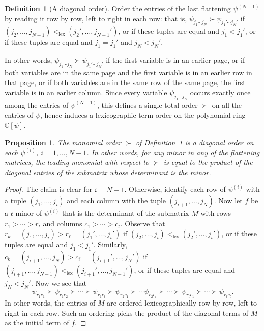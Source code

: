 \documentclass[12pt]{article}
\newtheorem{proposition}[theorem]{Proposition}
\theoremstyle{definition}
\newtheorem{definition}[theorem]{Definition}
\numberwithin{theorem}{section}
\newcommand{\CC}{\mathbb{C}}
\begin{document}
\begin{definition}[A diagonal order]\label{defn: diagonal order}
Order the entries of the last flattening $\psi^{(N-1)}$ by reading it row by row, left to right in each row: that is, $\psi_{j_1\cdots j_N} \succ \psi_{j_1'\cdots j_N'}$ if $(j_2,\ldots,j_{N-1}) <_{\mathrm{lex}} (j_2',\ldots,j_{N-1}')$, or if these tuples are equal and $j_1<j_1'$, or if these tuples are equal and $j_1=j_1'$ and $j_N<j_N'$. 
\end{definition}
In other words, $\psi_{j_1\cdots j_N} \succ \psi_{j_1' \cdots j_N'}$ if the first variable is in an earlier page, or if both variables are in the same page and the first variable is in an earlier row in that page, or if both variables are in the same row of the same page, the first variable is in an earlier column. Since every variable $\psi_{j_1\cdots j_N}$ occurs exactly once among the entries of $\psi^{(N-1)}$, this defines a single total order $\succ$ on all the entries of $\psi$,
hence induces a lexicographic term order on the polynomial ring $\CC[\psi]$. 
\begin{proposition}\label{prop:global-order}
The monomial order $\succ$ of Definition~\ref{defn: diagonal order} is a diagonal order on 
each $\psi^{(i)}$, $i=1,\ldots, N-1$. 
 In other words, 
 for any minor in any of the flattening matrices, the leading monomial with respect to $\succ$ is equal to the product of the diagonal entries of the submatrix whose determinant is the minor.
\end{proposition}
\begin{proof}
The claim is  clear for $i=N-1$. Otherwise, identify each row of $\psi^{(i)}$ with a tuple $(j_1,\ldots,j_i)$ and each column with the tuple $(j_{i+1},\ldots,j_N)$. Now let $f$ be a $t$-minor of $\psi^{(i)}$ that is the determinant of the submatrix $M$ with rows $r_1 > \cdots >r_t$ and columns $c_1> \cdots >c_t$. 
Observe that  $r_k = (j_1, \ldots, j_i) > r_\ell = (j_1', \ldots, j_i')$ if $(j_2, \ldots, j_i) <_{\mathrm{lex}} (j_2', \ldots, j_i')$, 
or if these tuples are equal and $j_1 < j_1'$. Similarly, $c_k = (j_{i+1}, \ldots, j_N) > c_\ell = (j_{i+1}', \ldots, j_N')$ if $(j_{i+1}, \ldots, j_{N-1}) <_{\mathrm{lex}} (j_{i+1}', \ldots, j_{N-1}')$, 
or if these tuples are equal and $j_N < j_N'$.
Now we see that 
$$\psi_{r_1c_1} \succ \psi_{r_1c_2} \succ \cdots \succ \psi_{r_1c_t} \succ \psi_{r_2c_1} \succ \cdots \psi_{r_2c_t} \succ \cdots \succ \psi_{r_tc_1} \succ \cdots \succ \psi_{r_tc_t}.$$
In other words, the entries of $M$ are ordered lexicographically row by row, left to right in each row. Such an ordering picks the product of the diagonal terms of $M$ as the initial term of $f$. 
\end{proof}
\end{document}
